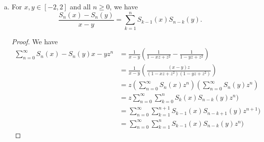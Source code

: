 \documentclass{article}
\begin{document}
\begin{enumerate}[(a)]
\begin{proof}
      Letting $x = 2 \cos(\theta)$, we have
      \begin{align*}
        \sum_{n=0}^\infty S_n(x) z^n & = \sum_{n=0}^\infty \frac{\sin((n+1) \theta)}{\sin{\theta}} z^n \\
        & =  \frac{1}{2i \sin(\theta)} \sum_{n=0}^\infty (e^{in\theta} - e^{-in\theta}) z^n \\
        & =  \frac{1}{2i \sin(\theta)} \sum_{n=0}^\infty (e^{i \theta}z)^n - (e^{-i \theta}z)^n \\
        & =  \frac{1}{2i \sin(\theta)} \left(\frac{1}{1 - (e^{i \theta}z)} - \frac{1}{1 -  (e^{-i \theta}z)} \right) \\
        & =  \frac{1}{2i \sin(\theta)} \left(\frac{2i\sin(\theta)}{1 -  2\cos(\theta)z + z^2} \right)\\
        & = \frac{1}{1 - xz + z^2}.
      \end{align*}
    \end{proof}

  \item For $x, y \in [-2,2]$ and all $n \ge 0$, we have
    $$\frac{S_n(x) - S_n(y)}{x - y} = \sum_{k = 1}^n S_{k-1}(x) S_{n-k}(y).$$
    
    \begin{proof}
      We have
      \begin{align*}
        \sum_{n = 0}^\infty {S_n(x) - S_n(y)}{x - y} z^n & = \frac{1}{x-y} \left( \frac{1}{1 - xz + z^2} - \frac{1}{1 - yz + z^2} \right) \\
        & = \frac{1}{x-y}\left(\frac{(x - y)z}{(1 - xz + z^2) (1 - yz + z^2)}\right) \\
        & = z \left( \sum_{n=0}^\infty S_n(x)z^n \right) \left(\sum_{n=0}^\infty S_n(y) z^n \right) \\
        & = z \sum_{n=0}^\infty \sum_{k = 0}^n S_k(x) S_{n-k}(y) z^n) \\
        & = \sum_{n=0}^\infty \sum_{k = 1}^{n+1} S_{k-1}(x) S_{n-k+1}(y) z^{n+1}) \\
        & = \sum_{n=0}^\infty \sum_{k = 1}^{n} S_{k-1}(x) S_{n-k}(y) z^{n})
      \end{align*}
    \end{proof}
  \end{enumerate}
\end{document}
